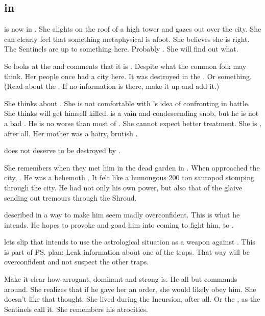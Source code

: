 \subsection{\Achsah in \Forclin}
\Achsah is now in \Forclin. 
She alights on the roof of a high tower and gazes out over the city. 
She can clearly feel that something metaphysical is afoot. 
She believes she is right. 
The Sentinels are up to something here. 
Probably \Secherdamon. 
She will find out what. 

Se looks at the  and comments that it is . 
Despite what the common folk may think. 
Her people once had a city here.
It was destroyed in the \resphanwars. 
Or something. 
(Read about the . 
 If no information is there, make it up and add it.)

She thinks about \Ishnaruchaefir. 
She is not comfortable with \Teshrial's idea of confronting \Ishnaruchaefir in battle. 
She thinks \Teshrial will get himself killed. 
\Teshrial is a vain and condescending snob, but he is not a bad \resphan.
He is no worse than most of \CiriathSepher. 
She cannot expect better treatment. 
She is \ashenblooded, after all. 
Her mother was a hairy, brutish \nephil. 

\Teshrial does not deserve to be destroyed by \Ishnaruchaefir. 

She remembers \Ishnaruchaefir when they met him in the dead garden in \Malcur. 
When \Ishnaruchaefir{} approached the city, \Achsah{} . 
He was a behemoth \vertex. 
It felt like a humongous 200 ton sauropod stomping through the city. 
He had not only his own \vertex{} power, but also that of the glaive sending out tremours through the Shroud. 

\Achsah{} described \Teshrial{} in a way to make him seem madly overconfident. 
This is what he intends. 
He hopes to provoke \Ishnaruchaefir{} and goad him into coming to fight him, to . 

\Achsah{} lets slip that \Teshrial{} intends to use the astrological situation as a weapon against \Ishnaruchaefir. 
This is part of \ps{\Teshrial} plan: 
Leak information about one of the traps. 
That way \Ishnaruchaefir{} will be overconfident and not suspect the other traps. 

Make it clear how arrogant, dominant and strong \QuessanthIshnaruchaefir{} is. 
He all but commands \Achsah{} around. 
She realizes that if he gave her an order, she would likely obey him. 
She doesn't like that thought. 
She lived during the Incursion, after all. 
Or the \secondbanewar, as the Sentinels call it. 
She remembers his atrocities. 

